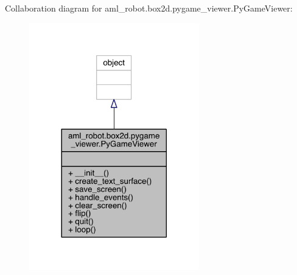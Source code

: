 Collaboration diagram for aml\+\_\+robot.\+box2d.\+pygame\+\_\+viewer.\+Py\+Game\+Viewer\+:\nopagebreak
\begin{figure}[H]
\begin{center}
\leavevmode
\includegraphics[width=209pt]{classaml__robot_1_1box2d_1_1pygame__viewer_1_1_py_game_viewer__coll__graph}
\end{center}
\end{figure}
